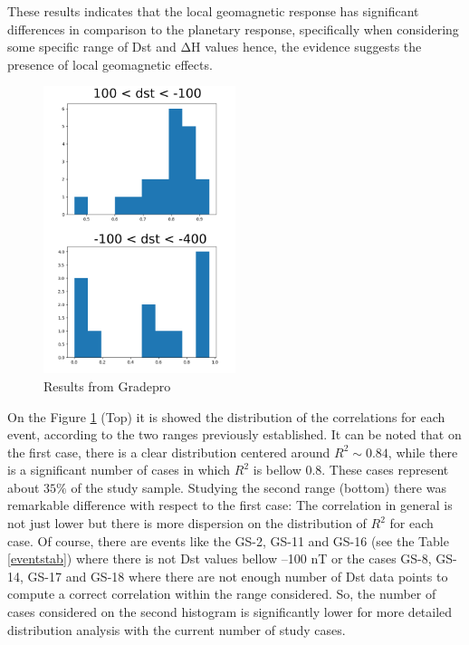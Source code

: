 \documentclass[a4paper, 11pt]{article}
\begin{document}
These results indicates that the local geomagnetic response has significant differences in comparison to the planetary response, specifically when considering some specific range of Dst and $\mathrm{\Delta H}$ values hence, the evidence suggests the presence of local geomagnetic effects.\\   

\begin{figure}
\centering
\includegraphics[width=0.5\textwidth]{hist.png}
\caption{\label{hist}Results from Gradepro}
\end{figure}

On the Figure \ref{hist} (Top) it is showed the distribution of the correlations for each event, according to the two ranges previously established. It can be noted that on the first case, there is a clear distribution centered around $R^2 \sim 0.84$, while there is a significant number of cases in which $R^2$ is bellow 0.8. These cases represent about $35\%$ of the study sample. Studying the second range (bottom) there was remarkable difference with respect to the first case: The correlation in general is not just lower but there is more dispersion on the distribution of $R^2$ for each case. Of course, there are events like the GS-2, GS-11 and GS-16 (see the Table \ref{eventstab}) where there is not Dst values bellow –100 nT or the cases GS-8, GS-14, GS-17 and GS-18 where there are not enough number of Dst data points to compute a correct correlation within the range considered. So, the number of cases considered on the second histogram is significantly lower for more detailed distribution analysis with the current number of study cases. \\ 
\end{document}
